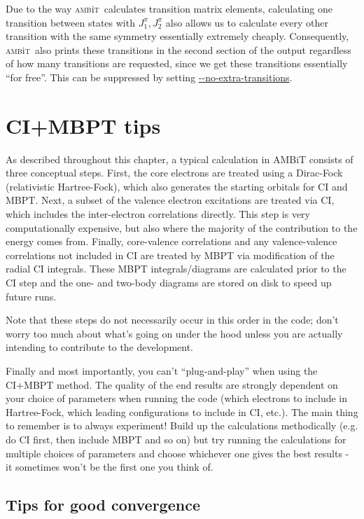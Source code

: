 \documentclass{report}
\newcommand{\ambit}{\textsc{amb}{\footnotesize i}\textsc{t}}
\begin{document}
Due to the way \ambit\  calculates transition matrix elements, calculating one transition between states
with $J^{\pi}_1, J^{\pi}_2$ also allows us to calculate every other transition with the same 
symmetry essentially extremely cheaply. Consequently, \ambit\  also prints these transitions in the 
second section of the output regardless of how many transitions are requested, since we get these
transitions essentially ``for free''. This can be suppressed by setting \hyperref[keyword:--no-extra-transitions]{{-}{-}no-extra-transitions}.

\section{CI+MBPT tips}
\label{sec:CI_tips}

As described throughout this chapter, a typical calculation in AMBiT consists of three conceptual steps.
First, the core electrons are treated using a Dirac-Fock (relativistic
Hartree-Fock), which also generates the starting orbitals for CI and
MBPT. Next, a subset of the valence electron excitations are treated via
CI, which includes the inter-electron correlations directly. This step
is very computationally expensive, but also where the majority of the
contribution to the energy comes from. Finally, core-valence
correlations and any valence-valence correlations not included in CI are
treated by MBPT via modification of the radial CI integrals. These MBPT
integrals/diagrams are calculated prior to the CI step and the one- and
two-body diagrams are stored on disk to speed up future runs.

Note that these steps do not necessarily occur in this order in
the code; don't worry too much about what's going on under the hood
unless you are actually intending to contribute to the development.

Finally and most importantly, you can't ``plug-and-play'' when using the CI+MBPT method. The quality of 
the end results are strongly
dependent on your choice of parameters when running the code (which
electrons to include in Hartree-Fock, which leading configurations to
include in CI, etc.). The main thing to remember is to always
experiment! Build up the calculations methodically (e.g. do CI first,
then include MBPT and so on) but try running the calculations for
multiple choices of parameters and choose whichever one gives the best
results - it sometimes won't be the first one you think of.

\subsection{Tips for good convergence}
\end{document}
